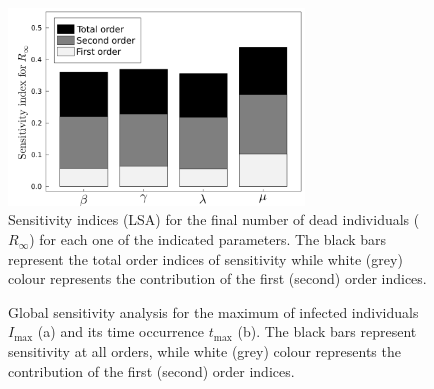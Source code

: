 \begin{figure}[H]
    \centering
    \includegraphics[width=0.7\textwidth]{Figures/GSA_R_inf.png}
    \caption{Sensitivity indices (LSA) for the final number of dead
        individuals ($R_\infty$) for each one of the indicated parameters. The
        black
        bars represent the total order indices of sensitivity while white
        (grey) colour
        represents the contribution of the first (second) order indices.}
    \label{fig: GSA_R_inf}
\end{figure}

\begin{figure}[H]
    \centering
    \caption{Global sensitivity analysis for the maximum of infected
        individuals $I_{\textrm{max}}$ (a) and its time occurrence
        $t_{\textrm{max}}$
        (b). The black bars represent sensitivity at all orders,
        while white (grey) colour represents the contribution of the first
        (second) order indices.}
    \label{fig: GS_analysis}
\end{figure}

